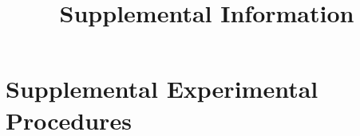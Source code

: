 \documentclass[a4paper, 10pt]{article}
\title{\textbf{Supplemental Information} }
\date{}
\begin{document}
\maketitle

\clearpage



\section*{Supplemental Experimental Procedures}








\medskip

{\small


}
\end{document}
